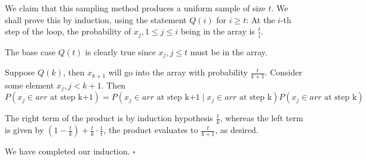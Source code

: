 \documentclass[a4paper]{article}
\newcommand{\rbracket}[1]{\left(#1\right)} %
\begin{document}
We claim that this sampling method produces a uniform sample of size $t$. We shall prove this by induction, using the statement $Q(i)$ for $i\geq t$: At the $i$-th step of the loop, the probability of $x_j, 1\leq j\leq i$ being in the array is $\frac{t}{i}$.

The base case $Q(t)$ is clearly true since $x_j, j\leq t$ must be in the array.

Suppose $Q(k)$, then $x_{k+1}$ will go into the array with probability $\frac{t}{k+1}$. Consider some element $x_j, j < k+1$. Then
\begin{equation}
	P(x_j\in arr \text{ at step k+1}) = P(x_j\in arr \text{ at step k+1}\mid x_j\in arr \text{ at step k})P(x_j\in arr \text{ at step k})
\end{equation}

The right term of the product is by induction hypothesis $\frac{t}{k}$, whereas the left term is given by $\rbracket{1 - \frac{t}{k}} + \frac{t}{k} \cdot \frac{1}{t}$, the product evaluates to $\frac{t}{k+1}$, as desired.

We have completed our induction. $\square$
\end{document}
